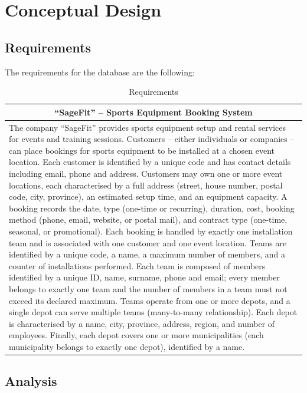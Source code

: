\section{Conceptual Design}
\subsection{Requirements}
The requirements for the database are the following:
\begin{table}[H]
    \renewcommand{\arraystretch}{1.3}
    \begin{tabularx}{\textwidth}{|X|}
    \hline
    \multicolumn{1}{|c|}{\textbf{``SageFit'' -- Sports Equipment Booking System}} \\ \hline
    The company ``SageFit'' provides sports equipment setup and rental services for events and training sessions.
    Customers -- either individuals or companies -- can place bookings for sports equipment to be installed at a
    chosen event location. Each customer is identified by a unique code and has contact details including email,
    phone and address. Customers may own one or more event locations, each characterised by a full address
    (street, house number, postal code, city, province), an estimated setup time, and an equipment capacity.
    A booking records the date, type (one-time or recurring), duration, cost, booking method (phone, email,
    website, or postal mail), and contract type (one-time, seasonal, or promotional). Each booking is handled
    by exactly one installation team and is associated with one customer and one event location.
    Teams are identified by a unique code, a name, a maximum number of members, and a counter of
    installations performed. Each team is composed of members identified by a unique ID, name, surname, phone
    and email; every member belongs to exactly one team and the number of members in a team must not exceed
    its declared maximum. Teams operate from one or more depots, and a single depot can serve multiple teams
    (many-to-many relationship). Each depot is characterised by a name, city, province, address, region, and
    number of employees. Finally, each depot covers one or more municipalities (each municipality belongs to
    exactly one depot), identified by a name. \\ \hline
    \end{tabularx}
    \caption{Requirements}
\end{table}


\subsection{Analysis}

